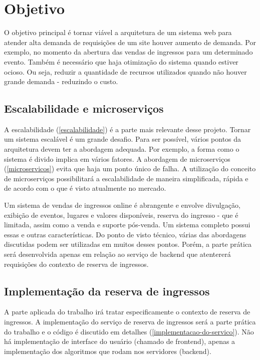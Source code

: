 \chapter{Objetivo}

O objetivo principal é tornar viável a arquitetura de um sistema web para atender
alta demanda de requisições de um site houver aumento de demanda.
Por exemplo, no momento da abertura das vendas de ingressos para um determinado evento.
Também é necessário que haja otimização do sistema quando estiver ocioso.
Ou seja, reduzir a quantidade de recursos utilizados quando não houver
grande demanda - reduzindo o custo.

\section{Escalabilidade e microserviços}
A escalabilidade (\autoref{escalabilidade}) é a parte mais relevante desse projeto.
Tornar um sistema escalável é um grande desafio.
Para ser possível, vários pontos da arquitetura devem ter a
abordagem adequada. Por exemplo, a forma como o sistema é divido implica em vários
fatores.
A abordagem de microserviços (\autoref{microservicos}) evita que haja um ponto único de falha. A
utilização do conceito de microserviços possibilitará a escalabilidade de maneira
simplificada, rápida e de acordo com o que é visto atualmente no mercado.

Um sistema de vendas de ingressos online é abrangente e envolve divulgação,
exibição de eventos, lugares e valores disponíveis, reserva do ingresso -
que é limitada, assim como a venda e suporte pós-venda. Um sistema completo possui essas
e outras características. Do ponto de visto técnico, várias das abordagens discutidas
podem ser utilizadas em muitos desses pontos. Porém, a parte prática será desenvolvida
apenas em relação ao serviço de backend que atentererá requisições do contexto de reserva
de ingressos.

\section{Implementação da reserva de ingressos}

A parte aplicada do trabalho irá tratar especificamente o contexto de reserva de ingressos.
A implementação do serviço de reserva de ingressos será a parte prática do trabalho
e o código é discutido em detalhes (\autoref{implementacao-do-servico}). Não há implementação
de interface do usuário (chamado de frontend), apenas a implementação dos algoritmos
que rodam nos servidores (backend).

